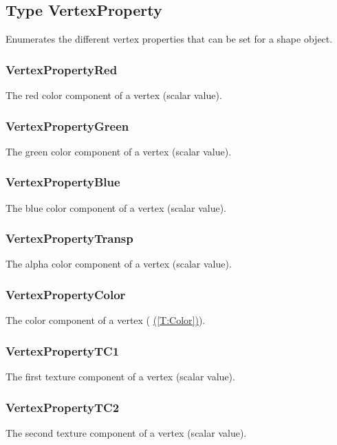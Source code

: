 \documentclass[10pt]{book}
\newcommand{\linkitem}[1]{\hyperref[#1]{\nameref{#1} (\ref{#1})}}
\begin{document}
\subsection{Type VertexProperty \label{T:VertexProperty}}
Enumerates the different vertex properties that can be set for a shape object.

\subsubsection{VertexPropertyRed \label{T:VertexProperty|VertexPropertyRed}}
The red color component of a vertex (scalar value).

\subsubsection{VertexPropertyGreen \label{T:VertexProperty|VertexPropertyGreen}}
The green color component of a vertex (scalar value).

\subsubsection{VertexPropertyBlue \label{T:VertexProperty|VertexPropertyBlue}}
The blue color component of a vertex (scalar value).

\subsubsection{VertexPropertyTransp \label{T:VertexProperty|VertexPropertyTransp}}
The alpha color component of a vertex (scalar value).

\subsubsection{VertexPropertyColor \label{T:VertexProperty|VertexPropertyColor}}
The color component of a vertex ( \linkitem{T:Color}).

\subsubsection{VertexPropertyTC1 \label{T:VertexProperty|VertexPropertyTC1}}
The first texture component of a vertex (scalar value).


\subsubsection{VertexPropertyTC2 \label{T:VertexProperty|VertexPropertyTC2}}
The second texture component of a vertex (scalar value).
\end{document}
